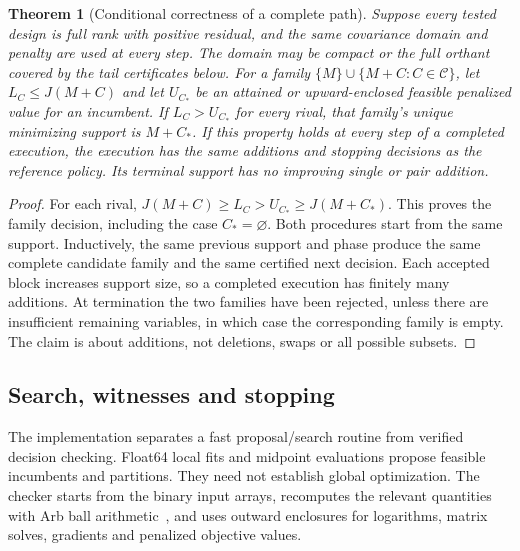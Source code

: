 \documentclass[preprint,11pt,numbers]{elsarticle}
\newtheorem{theorem}{Theorem}
\theoremstyle{remark}\newtheorem{remark}[theorem]{Remark}
\newcommand{\calC}{\mathcal C}
\begin{document}
\begin{theorem}[Conditional correctness of a complete path]\label{thm:path}
Suppose every tested design is full rank with positive residual, and the same
covariance domain and penalty are used at every step. The domain may be compact
or the full orthant covered by the tail certificates below. For a family
$\{M\}\cup\{M+C:C\in\calC\}$, let $L_C\leq J(M+C)$ and let $U_{C_*}$ be
an attained or upward-enclosed feasible penalized value for an incumbent.
If $L_C>U_{C_*}$ for every rival, that family's unique minimizing support is
$M+C_*$. If this property holds at every step of a completed execution, the
execution has the same additions and stopping decisions as the reference policy.
Its terminal support has no improving single or pair addition.
\end{theorem}
\begin{proof}
For each rival, $J(M+C)\geq L_C>U_{C_*}\geq J(M+C_*)$.
This proves the family decision, including the case $C_*=\varnothing$.
Both procedures start from the same support. Inductively, the same previous
support and phase produce the same complete candidate family and the same
certified next decision. Each accepted block increases support size, so a
completed execution has finitely many additions. At termination the two families
have been rejected, unless there are insufficient remaining variables, in which
case the corresponding family is empty. The claim is about additions, not
deletions, swaps or all possible subsets.
\end{proof}


\subsection{Search, witnesses and stopping}
The implementation separates a fast proposal/search routine from verified
decision checking. Float64 local fits and midpoint evaluations propose feasible
incumbents and partitions. They need not establish global optimization. The
checker starts from the binary input arrays, recomputes the relevant quantities
with Arb ball arithmetic~\cite{arb}, and uses outward enclosures for logarithms,
matrix solves, gradients and penalized objective values.
\end{document}
